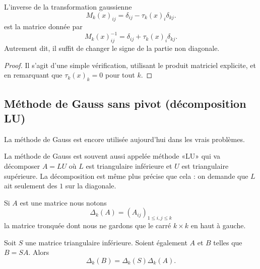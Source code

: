 \begin{lemma}       \label{LEMooFHZDooZiKdbr}
    L'inverse de la transformation gaussienne 
    \begin{equation}
        M_k(x)_{ij}=\delta_{ij}-\tau_k(x)_i\delta_{kj}.
    \end{equation}
    est la matrice donnée par
    \begin{equation}
        M_k(x)^{-1}_{ij}=\delta_{ij}+\tau_k(x)_i\delta_{kj}.
    \end{equation}
    Autrement dit, il suffit de changer le signe de la partie non diagonale.
\end{lemma}

\begin{proof}
    Il s'agit d'une simple vérification, utilisant le produit matriciel explicite, et en remarquant que \( \tau_k(x)_k=0\) pour tout \( k\).
\end{proof}

\subsection{Méthode de Gauss sans pivot (décomposition LU)}

La méthode de Gauss est encore utilisée aujourd'hui dans les vrais problèmes.

La méthode de Gauss est souvent aussi appelée méthode «LU» qui va décomposer \( A=LU\) où \( L\) est triangulaire inférieure et \( U\) est triangulaire supérieure. La décomposition est même plus précise que cela : on demande que \( L\) ait seulement des \( 1\) sur la diagonale.

Si \( A\) est une matrice nous notons 
\begin{equation}
    \Delta_k(A)= (A_{ij})_{1\leq i,j\leq k}
\end{equation}
la matrice tronquée dont nous ne gardons que le carré \( k\times k\) en haut à gauche.

\begin{lemma}       \label{LEMooXEJFooGiYoyb}
    Soit \( S\) une matrice triangulaire inférieure. Soient également \( A\) et \( B\) telles que \( B=SA\). Alors
    \begin{equation}
        \Delta_k(B)=\Delta_k(S)\Delta_k(A).
    \end{equation}
\end{lemma}

